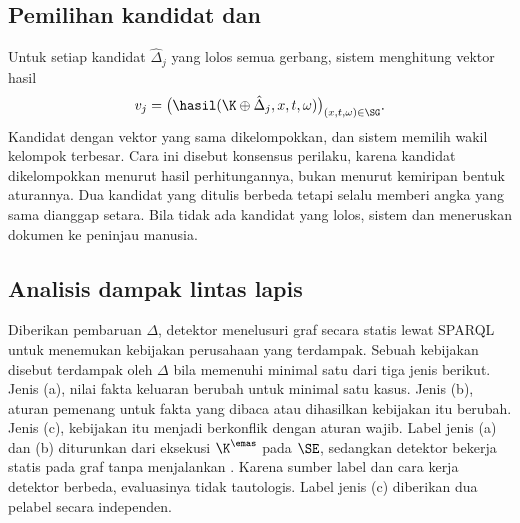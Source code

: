 \subsection{Pemilihan kandidat dan }
\label{subsec:konsensus}

Untuk setiap kandidat $\hat{\Delta}_j$ yang lolos semua gerbang, sistem menghitung vektor hasil
\begin{equation}
v_j = \big(\hasil(\K \oplus \hat{\Delta}_j, x, t, \omega)\big)_{(x,t,\omega) \in \SG}.
\label{eq:vektor}
\end{equation}
Kandidat dengan vektor yang sama dikelompokkan, dan sistem memilih wakil kelompok terbesar. Cara ini disebut konsensus perilaku, karena kandidat dikelompokkan menurut hasil perhitungannya, bukan menurut kemiripan bentuk aturannya. Dua kandidat yang ditulis berbeda tetapi selalu memberi angka yang sama dianggap setara. Bila tidak ada kandidat yang lolos, sistem  dan meneruskan dokumen ke peninjau manusia.


\subsection{Analisis dampak lintas lapis}
\label{subsec:dampak}

Diberikan pembaruan $\Delta$, detektor menelusuri graf secara statis lewat  SPARQL untuk menemukan kebijakan perusahaan yang terdampak. Sebuah kebijakan disebut terdampak oleh $\Delta$ bila memenuhi minimal satu dari tiga jenis berikut. Jenis (a), nilai fakta keluaran berubah untuk minimal satu kasus. Jenis (b), aturan pemenang untuk fakta yang dibaca atau dihasilkan kebijakan itu berubah. Jenis (c), kebijakan itu menjadi berkonflik dengan aturan wajib. Label jenis (a) dan (b) diturunkan dari eksekusi $\K^{\emas}$ pada $\SE$, sedangkan detektor bekerja statis pada graf tanpa menjalankan . Karena sumber label dan cara kerja detektor berbeda, evaluasinya tidak tautologis. Label jenis (c) diberikan dua pelabel secara independen.

